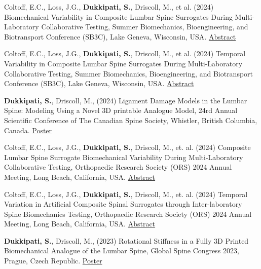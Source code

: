 \documentclass[10pt, letterpaper]{article}
\let\hrefWithoutArrow\href
\renewcommand{\href}[2]{\hrefWithoutArrow{#1}{\ifthenelse{\equal{#2}{}}{ }{#2 }\raisebox{.15ex}{\footnotesize \faExternalLink*}}}
\begin{document}
\begin{enumerate}
    {\item{
    { Coltoff, E.C., Loss, J.G., \textbf{Dukkipati, S.}, Driscoll, M., et al. (2024) Biomechanical Variability in Composite Lumbar Spine Surrogates During Multi-Laboratory Collaborative Testing, Summer Biomechanics, Bioengineering, and Biotransport Conference (SB3C), Lake Geneva, Wisconsin, USA. \hrefWithoutArrow{https://sb3c.org/wp-content/uploads/2024/SB3C2024_Proceedings_Book.pdf\#page=812}{ {Abstract}}}}}

    {\item{
    { Coltoff, E.C., Loss, J.G., \textbf{Dukkipati, S.}, Driscoll, M., et al. (2024) Temporal Variability in Composite Lumbar Spine Surrogates During Multi-Laboratory Collaborative Testing, Summer Biomechanics, Bioengineering, and Biotransport Conference (SB3C), Lake Geneva, Wisconsin, USA. \hrefWithoutArrow{https://sb3c.org/wp-content/uploads/2024/SB3C2024_Proceedings_Book.pdf\#page=832}{ {Abstract}}}}}

    {\item{
    { \textbf{Dukkipati, S.}, Driscoll, M., (2024) Ligament Damage Models in the Lumbar Spine: Modeling Using a Novel 3D printable Analogue Model, 24rd Annual Scientific Conference of The Canadian Spine Society, Whistler, British Columbia, Canada. \hrefWithoutArrow{http://dx.doi.org/10.13140/RG.2.2.18960.72968}{ {Poster}}}}}

    {\item{
    { Coltoff, E.C., Loss, J.G., \textbf{Dukkipati, S.}, Driscoll, M., et. al. (2024) Composite Lumbar Spine Surrogate Biomechanical Variability During Multi-Laboratory Collaborative Testing, Orthopaedic Research Society (ORS) 2024 Annual Meeting, Long Beach, California, USA. \hrefWithoutArrow{https://www.ors.org/wp-content/uploads/AM24/2230.pdf}{ {Abstract}}}}}

    {\item{
    { Coltoff, E.C., Loss, J.G., \textbf{Dukkipati, S.}, Driscoll, M., et. al. (2024) Temporal Variation in Artificial Composite Spinal Surrogates through Inter-laboratory Spine Biomechanics Testing,  Orthopaedic Research Society (ORS) 2024 Annual Meeting, Long Beach, California, USA. \hrefWithoutArrow{https://www.ors.org/wp-content/uploads/AM24/2228.pdf}{ {Abstract}}}}}


    {\item{
    { \textbf{Dukkipati, S.}, Driscoll, M., (2023) Rotational Stiffness in a Fully 3D Printed Biomechanical Analogue of the Lumbar Spine, Global Spine Congress 2023, Prague, Czech Republic. \hrefWithoutArrow{http://dx.doi.org/10.13140/RG.2.2.16024.71681}{ {Poster}}}}}


\end{enumerate}
\end{document}
